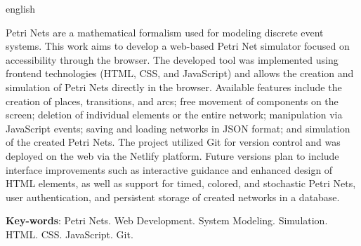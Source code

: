 \documentclass[
	12pt,				%
	openright,			%
	oneside,			%
	a4paper,			%
	english,			%
	brazil				%
	]{abntex2}
\theoremstyle{doispontos}
\begin{document}
\begin{resumo}[Abstract]
 \begin{otherlanguage*}{english}

\noindent 

Petri Nets are a mathematical formalism used for modeling discrete event systems. This work aims to develop a web-based Petri Net simulator focused on accessibility through the browser. The developed tool was implemented using frontend technologies (HTML, CSS, and JavaScript) and allows the creation and simulation of Petri Nets directly in the browser. Available features include the creation of places, transitions, and arcs; free movement of components on the screen; deletion of individual elements or the entire network; manipulation via JavaScript events; saving and loading networks in JSON format; and simulation of the created Petri Nets. The project utilized Git for version control and was deployed on the web via the Netlify platform. Future versions plan to include interface improvements such as interactive guidance and enhanced design of HTML elements, as well as support for timed, colored, and stochastic Petri Nets, user authentication, and persistent storage of created networks in a database.

   \vspace{\onelineskip}

   \noindent
   \textbf{Key-words}: Petri Nets. Web Development. System Modeling. Simulation. HTML. CSS. JavaScript. Git.
 \end{otherlanguage*}
\end{resumo}


\listoffigures*
\cleardoublepage


\cleardoublepage
{} %
\renewcommand{\lstlistlistingname}{Lista de Códigos}
\lstlistoflistings %
\cleardoublepage




\end{document}
